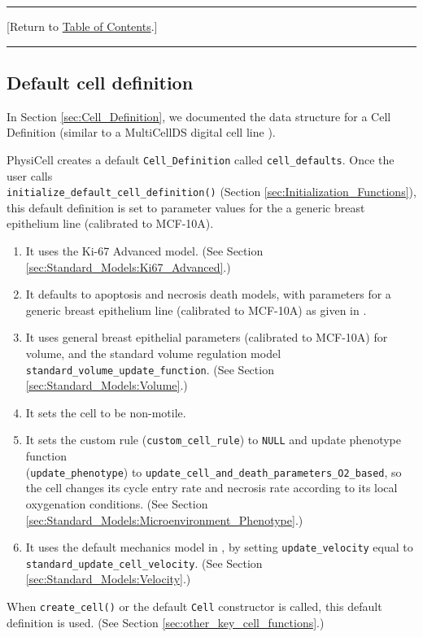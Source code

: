 \documentclass[12pt]{article}
\renewcommand{\v}{\verb}
\newcommand{\blue}[1]{\textcolor{blue}{#1}}
\newcommand{\DONE}{}%
\newcommand{\TOClink}{\begin{center}\hrule\vskip-5pt\phantom{.}\hfill[Return to \hyperlink{TOC}{Table of Contents}.]\hfill\phantom{.}\vskip3pt\hrule\end{center}}
\begin{document}
\TOClink 

\subsection{Default cell definition \DONE}
\label{sec:cell_definition_default}
In Section \ref{sec:Cell_Definition}, we documented the 
data structure for a Cell Definition (similar to a MultiCellDS 
digital cell line \cite{ref:MultiCellDS}).

PhysiCell creates a default \v|Cell_Definition| called 
\v|cell_defaults|. Once the 
user calls \\
\v|initialize_default_cell_definition()| (Section 
\ref{sec:Initialization_Functions}), this 
default definition is set to parameter values for the 
a generic breast epithelium line (calibrated to MCF-10A).  
\begin{enumerate} 
\item 
It uses the Ki-67 Advanced model. (See Section \ref{sec:Standard_Models:Ki67_Advanced}.) 
\item 
It defaults to apoptosis and necrosis death models, 
with parameters for 
a generic breast epithelium line (calibrated to MCF-10A) 
as given in \cite{ref:PhysiCell}. 
\item 
It uses general breast epithelial parameters (calibrated to MCF-10A) 
for volume, and 
the standard volume regulation model \\
\v|standard_volume_update_function|. (See Section \ref{sec:Standard_Models:Volume}.) 
\item 
It sets the cell to be non-motile. 
\item 
It sets the custom rule (\v|custom_cell_rule|) to \v|NULL| and 
update phenotype function \\
(\v|update_phenotype|) to 
\v|update_cell_and_death_parameters_O2_based|, so the cell 
changes its cycle entry rate and necrosis 
rate according to its local oxygenation conditions. 
(See Section \ref{sec:Standard_Models:Microenvironment_Phenotype}.) 
\item 
It uses the default mechanics model in \cite{ref:PhysiCell}, 
by setting 
\v|update_velocity| equal to \\ 
\v|standard_update_cell_velocity|. 
(See Section \ref{sec:Standard_Models:Velocity}.) 
\end{enumerate}

When \v|create_cell()| or the default \v|Cell| constructor is called, 
this default definition is used. 
(See Section \ref{sec:other_key_cell_functions}.) 
\end{document}
